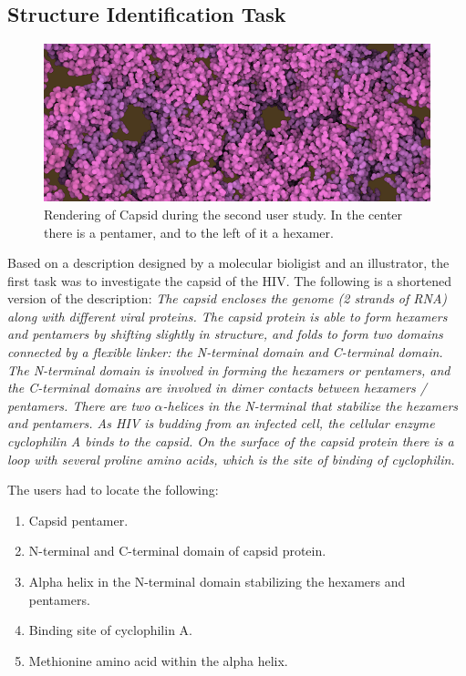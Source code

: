 \documentclass[review,journal]{vgtc}         %
\begin{document}
	\subsection{Structure Identification Task}
	\begin{figure}
		\centering
		\includegraphics[width=1\linewidth]{Figures/pentamerStudy}
		\caption{Rendering of Capsid during the second user study. In the center there is a pentamer, and to the left of it a hexamer.}
		\label{fig:pentamerStudy}
	\end{figure}
	Based on a description designed by a molecular bioligist and an illustrator, the first task was to investigate the capsid of the HIV. 
	The following is a shortened version of the description:
	\textit{
		The capsid encloses the genome (2 strands of RNA) along with different viral proteins. 
		The capsid protein is able to form hexamers and pentamers by shifting slightly in structure, and folds to form two domains connected by a flexible linker: the N-terminal domain and C-terminal domain. 
		The N-terminal domain is involved in forming the hexamers or pentamers, and the C-terminal domains are involved in dimer contacts between hexamers / pentamers. 
		There are two $\alpha$-helices in the N-terminal that stabilize the hexamers and pentamers. 
		As HIV is budding from an infected cell, the cellular enzyme cyclophilin A binds to the capsid. 
		On the surface of the capsid protein there is a loop with several proline amino acids, which is the site of binding of cyclophilin.}
	
	The users had to locate the following:
	
	\begin{enumerate}
		\itemsep0em 
		\item Capsid pentamer.
		\item N-terminal and C-terminal domain of capsid protein.
		\item Alpha helix in the N-terminal domain stabilizing the hexamers and pentamers.
		\item Binding site of cyclophilin A.
		\item Methionine amino acid within the alpha helix.
	\end{enumerate}
	
\end{document}
